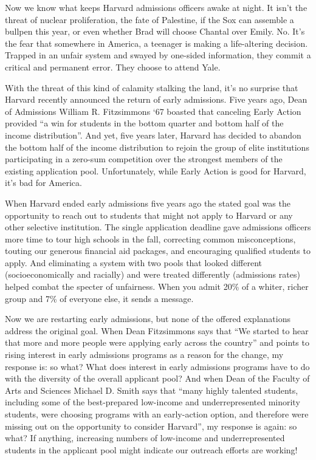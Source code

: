 
Now we know what keeps Harvard admissions officers awake at night. It isn't
the threat of nuclear proliferation, the fate of Palestine, if the Sox can
assemble a bullpen this year, or even whether Brad will choose Chantal over
Emily. No. It's the fear that somewhere in America, a teenager is making a
life-altering decision. Trapped in an unfair system and swayed by one-sided
information, they commit a critical and permanent error. They choose to
attend Yale.

With the threat of this kind of calamity stalking the land, it's no surprise
that Harvard recently announced the return of early admissions. Five years
ago, Dean of Admissions William R. Fitzsimmons `67 boasted that canceling
Early Action provided ``a win for students in the bottom quarter and bottom
half of the income distribution''. And yet, five years later, Harvard has
decided to abandon the bottom half of the income distribution to rejoin the
group of elite institutions participating in a zero-sum competition over the
strongest members of the existing application pool. Unfortunately, while
Early Action is good for Harvard, it's bad for America.

When Harvard ended early admissions five years ago the stated goal was the
opportunity to reach out to students that might not apply to Harvard or any
other selective institution. The single application deadline gave admissions
officers more time to tour high schools in the fall, correcting common
misconceptions, touting our generous financial aid packages, and encouraging
qualified students to apply. And eliminating a system with two pools that
looked different (socioeconomically and racially) and were treated
differently (admissions rates) helped combat the specter of unfairness. When
you admit 20\% of a whiter, richer group and 7\% of everyone else, it sends a
message.

Now we are restarting early admissions, but none of the offered explanations
address the original goal. When Dean Fitzsimmons says that ``We started to
hear that more and more people were applying early across the country'' and
points to rising interest in early admissions programs as a reason for the
change, my response is: so what? What does interest in early admissions
programs have to do with the diversity of the overall applicant pool? And
when Dean of the Faculty of Arts and Sciences Michael D. Smith says that
``many highly talented students, including some of the best-prepared
low-income and underrepresented minority students, were choosing programs
with an early-action option, and therefore were missing out on the
opportunity to consider Harvard'', my response is again: so what? If
anything, increasing numbers of low-income and underrepresented students in
the applicant pool might indicate our outreach efforts are working!

